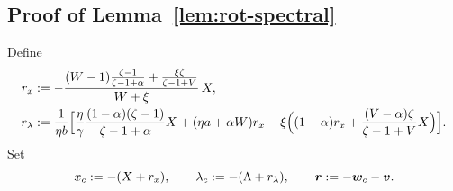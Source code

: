 \subsection{Proof of Lemma~\ref{lem:rot-spectral}}
\label{app:lb-rotation-spectral-proof}
Define
\[
\begin{aligned}
r_x&:=-\frac{(W-1)\frac{\zeta-1}{\zeta-1+\alpha}+\frac{\xi\zeta}{\zeta-1+V}}
  {W+\xi}\,X,\\
r_\lambda&:=\frac{1}{\eta b}\Bigl[\frac{\eta}{\gamma}
  \frac{(1-\alpha)(\zeta-1)}{\zeta-1+\alpha}X+(\eta a+\alpha W)r_x
  -\xi\Bigl((1-\alpha)r_x+\frac{(V-\alpha)\zeta}{\zeta-1+V}X\Bigr)\Bigr].
\end{aligned}
\]
Set
\begin{equation}
x_c:=-(X+r_x),\qquad \lambda_c:=-(\Lambda+r_\lambda),\qquad
\bm{r}:=-\bm{w}_c-\bm{v} .
\label{eq:rot-shift}
\end{equation}
